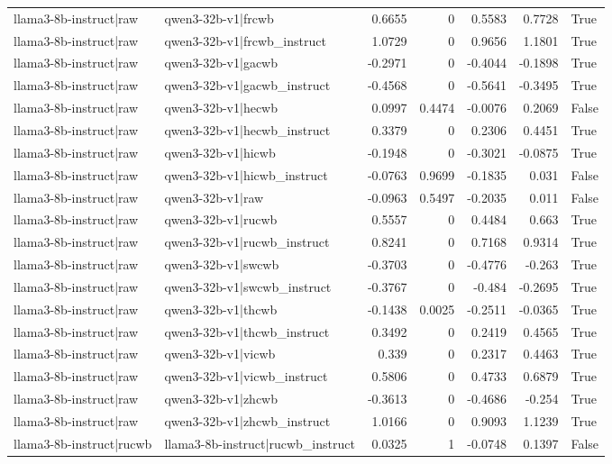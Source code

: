 \begin{table}
\begin{tabular}{l l r r r r l}
llama3-8b-instruct|raw & qwen3-32b-v1|frcwb & 0.6655 & 0 & 0.5583 & 0.7728 & True \\
llama3-8b-instruct|raw & qwen3-32b-v1|frcwb_instruct & 1.0729 & 0 & 0.9656 & 1.1801 & True \\
llama3-8b-instruct|raw & qwen3-32b-v1|gacwb & -0.2971 & 0 & -0.4044 & -0.1898 & True \\
llama3-8b-instruct|raw & qwen3-32b-v1|gacwb_instruct & -0.4568 & 0 & -0.5641 & -0.3495 & True \\
llama3-8b-instruct|raw & qwen3-32b-v1|hecwb & 0.0997 & 0.4474 & -0.0076 & 0.2069 & False \\
llama3-8b-instruct|raw & qwen3-32b-v1|hecwb_instruct & 0.3379 & 0 & 0.2306 & 0.4451 & True \\
llama3-8b-instruct|raw & qwen3-32b-v1|hicwb & -0.1948 & 0 & -0.3021 & -0.0875 & True \\
llama3-8b-instruct|raw & qwen3-32b-v1|hicwb_instruct & -0.0763 & 0.9699 & -0.1835 & 0.031 & False \\
llama3-8b-instruct|raw & qwen3-32b-v1|raw & -0.0963 & 0.5497 & -0.2035 & 0.011 & False \\
llama3-8b-instruct|raw & qwen3-32b-v1|rucwb & 0.5557 & 0 & 0.4484 & 0.663 & True \\
llama3-8b-instruct|raw & qwen3-32b-v1|rucwb_instruct & 0.8241 & 0 & 0.7168 & 0.9314 & True \\
llama3-8b-instruct|raw & qwen3-32b-v1|swcwb & -0.3703 & 0 & -0.4776 & -0.263 & True \\
llama3-8b-instruct|raw & qwen3-32b-v1|swcwb_instruct & -0.3767 & 0 & -0.484 & -0.2695 & True \\
llama3-8b-instruct|raw & qwen3-32b-v1|thcwb & -0.1438 & 0.0025 & -0.2511 & -0.0365 & True \\
llama3-8b-instruct|raw & qwen3-32b-v1|thcwb_instruct & 0.3492 & 0 & 0.2419 & 0.4565 & True \\
llama3-8b-instruct|raw & qwen3-32b-v1|vicwb & 0.339 & 0 & 0.2317 & 0.4463 & True \\
llama3-8b-instruct|raw & qwen3-32b-v1|vicwb_instruct & 0.5806 & 0 & 0.4733 & 0.6879 & True \\
llama3-8b-instruct|raw & qwen3-32b-v1|zhcwb & -0.3613 & 0 & -0.4686 & -0.254 & True \\
llama3-8b-instruct|raw & qwen3-32b-v1|zhcwb_instruct & 1.0166 & 0 & 0.9093 & 1.1239 & True \\
llama3-8b-instruct|rucwb & llama3-8b-instruct|rucwb_instruct & 0.0325 & 1 & -0.0748 & 0.1397 & False \\

\end{tabular}
\end{table}
